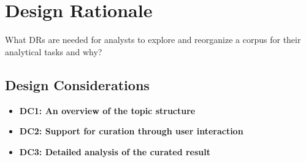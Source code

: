 \section{Design Rationale}
What DRs are needed for analysts to explore and reorganize a corpus for their analytical tasks and why?
\subsection{Design Considerations}
\begin{itemize}
    \setlength\itemsep{0em}
      \item \textbf{DC1: An overview of the topic structure} 
      \item \textbf{DC2: Support for curation through user interaction } 
      \item \textbf{DC3: Detailed analysis of the curated result } 
  \end{itemize}